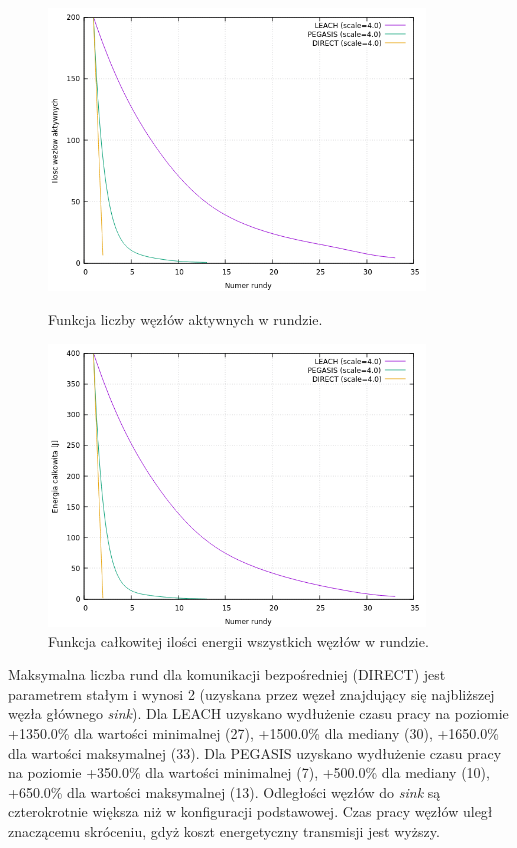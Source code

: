 \documentclass[a4paper,12pt,twoside,openany]{report}
\begin{document}
\begin{figure}[H]
 \centering
 \includegraphics[width=10cm]{images/gnuplot/test_3/nodes_in_round_xy800.png}
 \caption{Funkcja liczby węzłów aktywnych w rundzie.}
 \includegraphics[width=10cm]{images/gnuplot/test_3/energy_in_round_xy800.png}
 \caption{Funkcja całkowitej ilości energii wszystkich węzłów w rundzie.}
\end{figure}

\par
Maksymalna liczba rund dla komunikacji bezpośredniej (DIRECT) jest parametrem stałym i wynosi 2 (uzyskana przez węzeł znajdujący się najbliższej węzła głównego \textit{sink}).
Dla LEACH uzyskano wydłużenie czasu pracy na poziomie +1350.0\% dla wartości minimalnej (27), +1500.0\% dla mediany (30), +1650.0\% dla wartości maksymalnej (33).
Dla PEGASIS uzyskano wydłużenie czasu pracy na poziomie +350.0\% dla wartości minimalnej (7), +500.0\% dla mediany (10), +650.0\% dla wartości maksymalnej (13).
Odległości węzłów do \textit{sink} są czterokrotnie większa niż w konfiguracji podstawowej. Czas pracy węzłów uległ znaczącemu skróceniu, gdyż koszt energetyczny transmisji jest wyższy.
\end{document}
